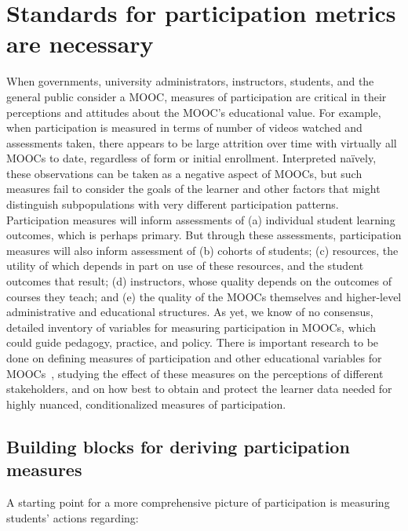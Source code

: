 \section{Standards for participation metrics are necessary}


When governments, university administrators, instructors, students, and
the general public consider a MOOC, measures of participation are
critical in their perceptions and attitudes about the MOOC's educational
value. For example, when participation is measured in terms of number of
videos watched and assessments taken, there appears to be large
attrition over time with virtually all MOOCs to date, regardless of form
or initial enrollment. Interpreted na\"{i}vely, these observations can be
taken as a negative aspect of MOOCs, but such measures fail to consider
the goals of the learner and other factors that might distinguish
subpopulations with very different participation patterns.
Participation measures will inform assessments of (a) individual student
learning outcomes, which is perhaps primary. But through these
assessments, participation measures will also inform assessment of (b)
cohorts of students; (c) resources, the utility of which depends in part
on use of these resources, and the student outcomes that result; (d)
instructors, whose quality depends on the outcomes of courses they
teach; and (e) the quality of the MOOCs themselves and higher-level
administrative and educational structures.  As yet, we know of no
consensus, detailed inventory of variables for measuring participation
in MOOCs, which could guide pedagogy, practice, and policy.
There is
important research to be done on defining measures of participation and
other educational variables for MOOCs~\cite{deboer-ho-reconceptualizing},
studying the effect of these measures on the perceptions of different
stakeholders, and on how best to obtain and protect the
learner data needed for highly nuanced, conditionalized
measures of participation.  

\subsection{Building blocks for deriving participation measures}

A starting point for a more comprehensive picture of
participation is measuring students' actions regarding: 


